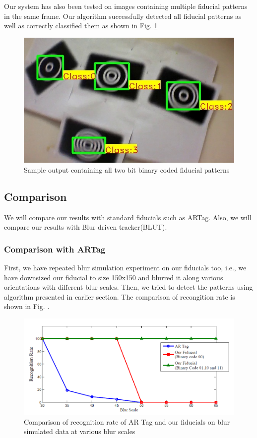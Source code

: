\documentclass[runningheads]{llncs}
\begin{document}
Our system has also been tested on images containing multiple fiducial patterns
in the same frame. Our algorithm successfully detected all fiducial patterns as
well as correctly classified them as shown in Fig. \ref{fig:output_all}
\begin{figure}
\centering
  \includegraphics[width=.8\linewidth]{output_all_2.jpg}
  \caption{Sample output containing all two bit binary coded fiducial patterns}
  \label{fig:output_all}
\end{figure}

\subsection{Comparison}
We will compare our results with standard fiducials such as ARTag. Also, we will
compare our results with Blur driven tracker(BLUT)\cite{Wu:2011}.
\subsubsection{Comparison with ARTag}
First, we have repeated blur simulation experiment on our fiducials too, i.e.,
we have downsized our fiducial to size 150x150 and blurred it along various
orientations with different blur scales. Then, we tried to detect the patterns
using algorithm presented in earlier section. The comparison of recongition
rate is shown in Fig. \label{fig:recognition_rate}. 

\begin{figure}
\centering
\includegraphics[width=\linewidth]{recognition_rate.png}
\caption{Comparison of recognition rate of AR Tag and our fiducials on
blur simulated data at various blur scales}
\label{fig:recognition_rate}
\end{figure}
\end{document}
